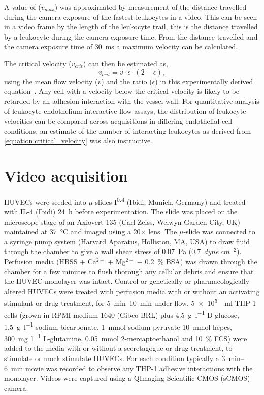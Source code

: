 A value of ($v_{max}$) was approximated by measurement of the distance travelled during the camera exposure of the fastest leukocytes in a video. This can be seen in a video frame by the length of the leukocyte trail, this is the distance travelled by a leukocyte during the camera exposure time. From the distance travelled and the camera exposure time of \SI{30}{\milli\second} a maximum velocity can be calculated.

The critical velocity ($v_{crit}$) can then be estimated as,
\begin{equation}
	v_{crit}=\bar{v}\cdot\epsilon\cdot(2-\epsilon),
\label{equation:critical_velocity}
\end{equation}
using the mean flow velocity ($\bar{v}$) and the ratio ($\epsilon$) in this experimentally derived equation~\cite{Ley1991}. Any cell with a velocity below the critical velocity is likely to be retarded by an adhesion interaction with the vessel wall. For quantitative analysis of leukocyte-endothelium interactive flow assays, the distribution of leukocyte velocities can be compared across acquisitions in differing endothelial cell conditions, an estimate of the number of interacting leukocytes as derived from \autoref{equation:critical_velocity} was also instructive.

\section{Video acquisition}
\label{leukocytes:acquisition}
HUVECs were seeded into $\mu$-slides I\textsuperscript{0.4} (Ibidi, Munich, Germany) and treated with IL-4 (Ibidi) \SI{24}{\hour} before experimentation. The slide was placed on the microscope stage of an Axiovert 135 (Carl Zeiss, Welwyn Garden City, UK) maintained at \SI{37}{\celsius} and imaged using a 20$\times$ lens. The $\mu$-slide was connected to a syringe pump system (Harvard Aparatus, Holliston, MA, USA) to draw fluid through the chamber to give a wall shear stress of \SI{0.07}{\pascal} (0.7~$dyne~cm^{-2}$). Perfusion media (HBSS $+$ Ca$^{2+}$ $+$ Mg$^{2+}$ $+$ 0.2~\% BSA) was drawn through the chamber for a few minutes to flush thorough any cellular debris and ensure that the HUVEC monolayer was intact. Control or genetically or pharmacologically  altered HUVECs were treated with perfusion media with or without an activating stimulant or drug treatment, for \SIrange{5}{10}{\minute} under flow. \SI{5e5}{\per\milli\litre} THP-1 cells (grown in RPMI medium 1640 (Gibco BRL) plus \SI{4.5}{\gram\per\litre} D-glucose, \SI{1.5}{\gram\per\litre} sodium bicarbonate, \SI{1}{\mmol} sodium pyruvate \SI{10}{\mmol} hepes, \SI{300}{\milli\gram\per\litre} L-glutamine, \SI{0.05}{\mmol} 2-mercaptoethanol and 10~\% FCS) were added to the media with or without a secretagogue or drug treatment, to stimulate or mock stimulate HUVECs. For each condition typically a \SIrange{3}{6}{\minute} movie was recorded to observe any THP-1 adhesive interactions with the monolayer. Videos were captured using a QImaging Scientific CMOS (sCMOS) camera.

